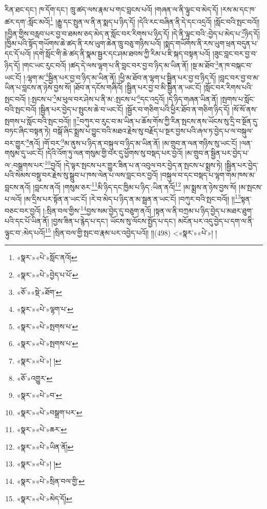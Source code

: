 རིན་ཐང་དང་། ཁ་དོག་དང་། ཁྲུ་ཚད་ལས་རྣམ་པ་གང་བླངས་པའོ། །གཞན་ལ་ནི་ལྟུང་བ་མེད་དོ། །རས་མ་དང་ཁ་ཚར་དག་:སློང་མའོ།\footnote{«སྣར་»«པེ་»སློང་ནའོ།} །རྒྱུ་དང་སྤུན་ལ་ནི་ན་སྨད་པ་ཉིད་དོ། །དེའི་རང་བཞིན་ནི་དེ་དང་འདྲའོ། །སློང་བའི་སྤང་བའོ།། །།བྱིན་གྱིས་བརླབ་པར་བྱ་བ་ཐམས་ཅད་མེད་ན་སློང་བར་རིགས་པ་ཉིད་དོ། །དེ་ནི་ལྟུང་བའི་:བྱེད་པ་མེད་པ་\footnote{«སྣར་»«པེ་»བྱེད་པ་པོ་}ཉིད་དོ། །ཁྱིམ་པའི་སྟོད་གཡོགས་ཆེ་ཚད་ནི་རས་ཡུག་ཆེན་ཁྲུ་བཅུ་གཉིས་པའོ། །སྨད་གཡོགས་ནི་རས་ཡུག་ཕྲན་བདུན་པ་དང་དོ་པའོ། །དགེ་སློང་གི་ཆེ་ཚད་ནི་སྣམ་སྦྱར་དང་ཤམ་ཐབས་ཀྱི་རིམ་པ་ཇི་སྐད་བསྟན་པའོ། །ཟུང་བླང་བར་བྱ་བ་ཉིད་དོ། །གང་ཡང་རུང་བའོ། །ཚད་དེ་ལས་ལྷག་པ་ནི་བླང་བར་བྱ་བ་ཉིད་མ་ཡིན་ནོ། །སྔ་མ་ཐོབ་\footnote{«ཅོ་»«སྡེ་»ཐོག་}ན་ཁ་བསྐང་བ་ཡང་ངོ། །:ལྷག་མ་\footnote{«སྣར་»«པེ་»ལྷག་པ་}སྦྱིན་པར་བྱ་བ་ཉིད་མ་ཡིན་ནོ། །ཕྱི་མ་ཐོབ་ན་ལྷག་པ་སྦྱིན་པར་བྱ་བ་ཉིད་དོ། །བླང་བར་བྱ་བ་མ་ཡིན་པ་བླངས་ན་ཉེས་བྱས་སོ། །ཐོབ་ན་དངོས་གཞིའོ། །སྦྱིན་པར་བྱ་བ་མི་སྦྱིན་ན་ཡང་ངོ། །སློང་བར་རིགས་པའི་སྤང་བའོ། །:སྤངས་པ་\footnote{«སྣར་»«པེ་»སྤགས་པ་}མ་ཕུལ་བར་ཤེས་པ་ནི་མ་:སྤངས་པ་\footnote{«སྣར་»«པེ་»སྤགས་པ་}དང་འདྲའོ། །དེ་ཉིད་གཞན་ཡིན་ནོ། །སྤགས་པ་སློང་བའི་སྤང་བའོ། །སྦྱིན་པར་བྱེད་པ་སྤུངས་ཆེ་བ་ཡང་ངོ། །སྦྱོར་བ་གཅིག་པའི་ཕྱིར་ཐོབ་ན་གཅིག་ཉིད་དོ། །སོ་སོ་ནས་སྤགས་པ་སློང་བའི་སྤང་བའོ།། །།\footnote{«སྣར་»«པེ་»། །}བཀུར་བ་རུང་བ་མ་ཡིན་པ་ཆོས་གོས་ཀྱི་རིན་སྤངས་ནས་ཡོངས་སུ་དྲི་བ་སྔོན་དུ་བཏང་ཞིང་བསྟན་ཏེ། བསྒོ་ཞིང་སྨྲས་པ་བྱུང་བའི་མཐའ་རྗེས་སུ་བརྗོད་པ་སྔར་བྱས་པའི་ཞལ་ཏ་བྱེད་པ་ལ་བསྐུལ་བར་གྱུར་\footnote{«ཅོ་»འགྱུར་}ནའོ། །གོ་བར་\footnote{«སྣར་»«པེ་»བ་}མ་ནུས་པ་ཉིད་ན་བསྐུལ་བ་ཉིད་མ་ཡིན་ནོ། །མ་གྲུབ་ན་ལན་གཉིས་སུ་ཡང་ངོ། །ལན་གསུམ་དུ་ཡང་ངོ། །དེའི་འོག་ཏུ་ལན་གསུམ་གྱི་བར་དུ་ཕྱོགས་སུ་བསྡད་པར་བྱའོ། །མ་གྲུབ་ན་སྦྱིན་པར་བྱེད་པ་ལ་:བསྒྲགས་པར་\footnote{«སྣར་»«པེ་»བསྒྲག་པར་}བྱའོ། །དེ་ལྟར་སྤངས་པར་གྱུར་ཟིན་པ་ན་འབུལ་བར་བྱེད་ན་སྤངས་པ་སྨྲས་ཏེ། །སྦྱིན་པར་བྱེད་པའི་སེམས་བསྡུ་བར་རྗེས་སུ་སྒྲུབ་པ་ཁས་ལེན་པ་ལས་བླང་བར་བྱའོ། །བསྐུལ་བ་དང་བསྡད་པ་ལྷག་གམ་ཁས་མ་བླངས་ནའོ། །བླངས་ནའོ། །གསུམ་ཅར་\footnote{«སྣར་»«པེ་»ཆར་}མི་ཉིད་དང་ཁྱིམ་པ་ཉིད་:ཡིན་ནའོ།\footnote{«སྣར་»«པེ་»ཡིན་ནོ།} །མ་སྨྲས་ན་ཉེས་བྱས་སོ། །མ་སྤངས་པ་ལའོ། །མ་དྲིས་པར་སྟོན་ན་ཡང་ངོ། །རེ་བ་མེད་པ་ཉིད་ན་མ་སྦྲན་ན་ཡང་ངོ། །བཀུར་བའི་སྤང་བའོ།། །།\footnote{«སྣར་»«པེ་»། །}སྟན་བཅང་བར་བྱའོ། །:སྲིན་བལ་གྱིས་\footnote{«སྣར་»«པེ་»སྲིན་བལ་གྱི་}བྱས་སམ་བྱེད་དུ་བཅུག་ནའོ། །སྟན་ལ་ནི་བཀྲམ་པ་ཉིད་བྱེད་པ་མཐར་ཐུག་པའི་དང་པོ་ཡིན་ནོ། །བྱས་ཟིན་པ་རྙེད་པ་དང་། ཡོངས་སུ་ལོངས་སྤྱོད་པ་དང་། མངོན་པར་འདུ་བྱེད་པ་དག་ལ་ནི་ལྟུང་བ་:མེད་པའོ།\footnote{«སྣར་»«པེ་»མེད་དོ།} །སྲིན་བལ་གྱི་སྤང་བ་རྣམ་པར་འབྱེད་པའོ།། །།(498) <«སྣར་»«པེ་»། །
